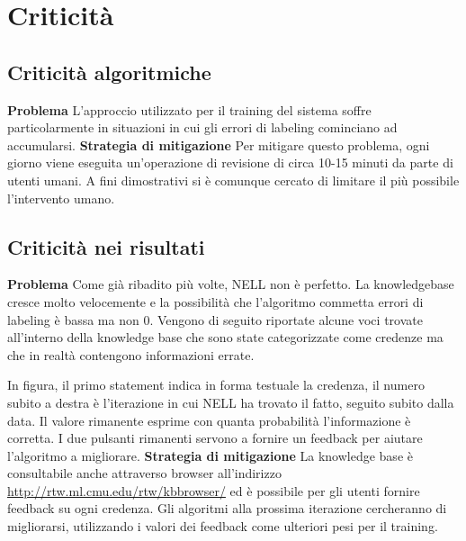 \section{Criticità}

\subsection{Criticità algoritmiche}
\warning \textbf{Problema}\warning\newline
L'approccio utilizzato per il training del sistema soffre particolarmente in situazioni in cui gli errori di labeling cominciano ad accumularsi.\newline
\faLightbulbO \textbf{Strategia di mitigazione} \faLightbulbO \newline
Per mitigare questo problema, ogni giorno viene eseguita un'operazione di revisione di circa 10-15 minuti da parte di utenti umani. A fini dimostrativi si è comunque cercato di limitare il più possibile l'intervento umano\cite{TowardAnArchitecture:online}.



\subsection{Criticità nei risultati}
\warning \textbf{Problema}\warning\newline
Come già ribadito più volte, NELL non è perfetto. La knowledgebase cresce molto velocemente e la possibilità che l'algoritmo commetta errori di labeling è bassa ma non 0. Vengono di seguito riportate alcune voci trovate all'interno della knowledge base che sono state categorizzate come credenze ma che in realtà contengono informazioni errate.

\noindent In figura, il primo statement indica in forma testuale la credenza, il numero subito a destra è l'iterazione in cui NELL ha trovato il fatto, seguito subito dalla data. Il valore rimanente esprime con quanta probabilità l'informazione è corretta. I due pulsanti rimanenti servono a fornire un feedback per aiutare l'algoritmo a migliorare.\newline
\faLightbulbO \textbf{Strategia di mitigazione} \faLightbulbO \newline
La knowledge base è consultabile anche attraverso browser all'indirizzo \url{http://rtw.ml.cmu.edu/rtw/kbbrowser/} ed è possibile per gli utenti fornire feedback su ogni credenza. Gli algoritmi alla prossima iterazione cercheranno di migliorarsi, utilizzando i valori dei feedback come ulteriori pesi per il training.
\newpage
